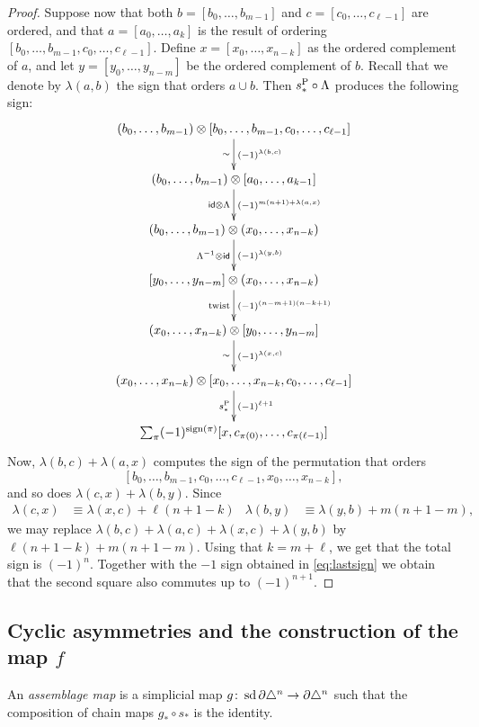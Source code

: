 \begin{proof}
	Suppose now that both $b=[b_0,\dots,b_{m-1}]$ and $c=[c_0,\dots,c_{\ell-1}]$ are ordered, and that $a = [a_0,\dots,a_k]$ is the result of ordering $[b_0,\dots,b_{m-1},c_0,\dots,c_{\ell-1}]$. Define $x=[x_0,\dots,x_{n-k}]$ as the ordered complement of $a$, and let $y=[y_0,\dots,y_{n-m}]$ be the ordered complement of $b$. Recall that we denote by $\lambda(a,b)$ the sign that orders $a\cup b$. Then $s_*^{\operatorname{P}}\circ \Lambda$ produces the following sign:
	\[
	\xymatrix{
		(b_0,\dots,b_{m-1}) \ot [b_0,\dots,b_{m-1},c_0,\dots,c_{\ell-1}]
		\ar[d]^-{(-1)^{\lambda(b,c)}}_-{\sim}
		\\
		(b_0,\dots,b_{m-1}) \ot [a_0,\dots,a_{k-1}]
		\ar[d]^{(-1)^{m(n+1)+\lambda(a,x)}}_{\id \ot \Lambda}
		\\
		(b_0,\dots,b_{m-1}) \ot (x_0,\dots,x_{n-k})
		\ar[d]^-{(-1)^{\lambda(y,b)}}_-{\Lambda^{-1} \ot \id}
		\\
		[y_0,\dots,y_{n-m}] \ot (x_0,\dots,x_{n-k})
		\ar[d]^-{(-1)^{(n-m+1)(n-k+1)}}_-{\twist}
		\\
		(x_0,\dots,x_{n-k}) \ot [y_0,\dots,y_{n-m}]
		\ar[d]^-{(-1)^{\lambda(x,c)}}_-{\sim}
		\\
		(x_0,\dots,x_{n-k}) \ot [x_0,\dots,x_{n-k},c_0,\dots,c_{\ell-1}]
		\ar[d]^-{(-1)^{\ell+1}}_-{s_*^{\Psd}}
		\\
		\sum_{\perm} (-1)^{\sign{\perm}}[x,c_{\perm(0)},\dots,c_{\perm(\ell-1)}]
	}
	\]
	Now, $\lambda(b,c) + \lambda(a,x)$ computes the sign of the permutation that orders
	\[
	[b_0,\dots,b_{m-1},c_0,\dots,c_{\ell-1},x_{0},\dots,x_{n-k}],
	\]
	and so does $\lambda(c,x)+\lambda(b,y)$. Since
	\begin{align*}
		\lambda(c,x) &\equiv \lambda(x,c) + \ell(n+1-k)
		&
		\lambda(b,y) &\equiv \lambda(y,b) + m(n+1-m),
	\end{align*}
	we may replace $\lambda(b,c)+\lambda(a,c) + \lambda(x,c) + \lambda(y,b)$ by $\ell(n+1-k)+m(n+1-m)$. Using that $k=m+\ell$, we get that the total sign is $(-1)^{n}$. Together with the $-1$ sign obtained in \eqref{eq:lastsign} we obtain that the second square also commutes up to $(-1)^{n+1}$.
\end{proof}

\subsection{Cyclic asymmetries and the construction of the map \texorpdfstring{$f$}{f}}

\begin{definition}
	An \emph{assemblage map} is a simplicial map $g \colon \operatorname{sd} \partial \triangle^n \to \partial \triangle^n$ such that the composition of chain maps $g_*\circ s_*$ is the identity.
\end{definition}

